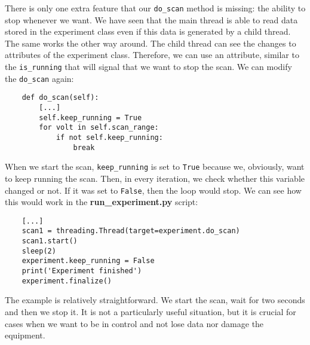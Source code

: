 
There is only one extra feature that our \texttt{do\_scan} method is missing: the ability to stop whenever we want. We have seen that the main thread is able to read data stored in the experiment class even if this data is generated by a child thread. The same works the other way around. The child thread can see the changes to attributes of the experiment class. Therefore, we can use an attribute, similar to the \texttt{is\_running} that will signal that we want to stop the scan. We can modify the \texttt{do\_scan} again:

\begin{verbatim}
    def do_scan(self):
        [...]
        self.keep_running = True
        for volt in self.scan_range:
            if not self.keep_running:
                break
\end{verbatim}
When we start the scan, \texttt{keep\_running} is set to \texttt{True} because we, obviously, want to keep running the scan. Then, in every iteration, we check whether this variable changed or not. If it was set to \texttt{False}, then the loop would stop. We can see how this would work in the \textbf{run\_experiment.py} script:

\begin{verbatim}
    [...]
    scan1 = threading.Thread(target=experiment.do_scan)
    scan1.start()
    sleep(2)
    experiment.keep_running = False
    print('Experiment finished')
    experiment.finalize()
\end{verbatim}

The example is relatively straightforward. We start the scan, wait for two seconds and then we stop it. It is not a particularly useful situation, but it is crucial for cases when we want to be in control and not lose data nor damage the equipment.

